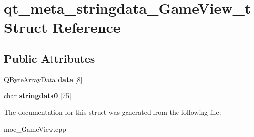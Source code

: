 \hypertarget{structqt__meta__stringdata__GameView__t}{}\section{qt\+\_\+meta\+\_\+stringdata\+\_\+\+Game\+View\+\_\+t Struct Reference}
\label{structqt__meta__stringdata__GameView__t}
\subsection*{Public Attributes}
\begin{DoxyCompactItemize}
\item 
Q\+Byte\+Array\+Data {\bfseries data} \mbox{[}8\mbox{]}\hypertarget{structqt__meta__stringdata__GameView__t_abc1cc08b46ef1355fef1672b17225eb9}{}\label{structqt__meta__stringdata__GameView__t_abc1cc08b46ef1355fef1672b17225eb9}

\item 
char {\bfseries stringdata0} \mbox{[}75\mbox{]}\hypertarget{structqt__meta__stringdata__GameView__t_ad3a15ffb1e0e2d81bc0bb03dbda20b9e}{}\label{structqt__meta__stringdata__GameView__t_ad3a15ffb1e0e2d81bc0bb03dbda20b9e}

\end{DoxyCompactItemize}


The documentation for this struct was generated from the following file\+:\begin{DoxyCompactItemize}
\item 
moc\+\_\+\+Game\+View.\+cpp\end{DoxyCompactItemize}
